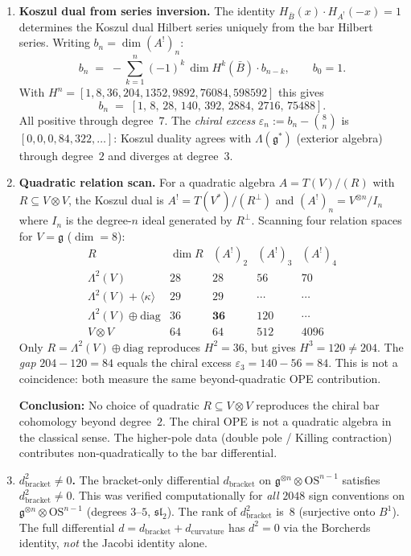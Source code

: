 \documentclass[11pt]{article}
\newcommand{\fg}{\mathfrak{g}}
\newcommand{\fsl}{\mathfrak{sl}}
\newcommand{\B}{\bar{B}}
\begin{document}
\begin{enumerate}[label=(\roman*)]
\item \textbf{Koszul dual from series inversion.}
The identity $H_{\B}(x)\cdot H_{A^!}(-x) = 1$ determines the
Koszul dual Hilbert series uniquely from the bar Hilbert series.
Writing $b_n = \dim (A^!)_n$:
\[
  b_n \;=\; -\sum_{k=1}^{n} (-1)^k\, \dim H^k(\B)\cdot b_{n-k},
  \qquad b_0 = 1.
\]
With $H^n = [1,8,36,204,1352,9892,76084,598592]$ this gives
\[
  b_n \;=\; [1,\,8,\,28,\,140,\,392,\,2884,\,2716,\,75488].
\]
All positive through degree~$7$.  The \emph{chiral excess}
$\varepsilon_n := b_n - \binom{8}{n}$ is $[0,0,0,84,322,\ldots]$:
Koszul duality agrees with $\Lambda(\fg^*)$ (exterior algebra) through
degree~$2$ and diverges at degree~$3$.

\item \textbf{Quadratic relation scan.}
For a quadratic algebra $A = T(V)/(R)$ with $R \subseteq V\otimes V$,
the Koszul dual is $A^! = T(V^*)/(R^\perp)$ and
$(A^!)_n = V^{\otimes n}/I_n$ where $I_n$ is the degree-$n$ ideal
generated by $R^\perp$.  Scanning four relation spaces for
$V = \fg$ ($\dim = 8$):
\[
\renewcommand{\arraystretch}{1.2}
\begin{array}{lcccc}
  R & \dim R & (A^!)_2 & (A^!)_3 & (A^!)_4 \\
  \hline
  \Lambda^2(V) & 28 & 28 & 56 & 70 \\
  \Lambda^2(V) + \langle\kappa\rangle & 29 & 29 & \cdots & \cdots \\
  \Lambda^2(V) \oplus \mathrm{diag} & 36 & \mathbf{36} & 120 & \cdots \\
  V\otimes V & 64 & 64 & 512 & 4096
\end{array}
\]
Only $R = \Lambda^2(V)\oplus\mathrm{diag}$ reproduces
$H^2 = 36$, but gives $H^3 = 120 \neq 204$.  The \emph{gap}
$204 - 120 = 84$ equals the chiral excess $\varepsilon_3 = 140 - 56 = 84$.
This is not a coincidence: both measure the same beyond-quadratic
OPE contribution.

\textbf{Conclusion:} No choice of quadratic $R\subseteq V\otimes V$
reproduces the chiral bar cohomology beyond degree~$2$.  The chiral
OPE is not a quadratic algebra in the classical sense.  The
higher-pole data (double pole / Killing contraction) contributes
non-quadratically to the bar differential.

\item \textbf{$d_{\mathrm{bracket}}^2 \neq 0$.}
The bracket-only differential $d_{\mathrm{bracket}}$ on
$\fg^{\otimes n}\otimes \mathrm{OS}^{n-1}$ satisfies
$d_{\mathrm{bracket}}^2 \neq 0$.  This was verified computationally
for \emph{all} $2048$ sign conventions on $\fg^{\otimes n}\otimes
\mathrm{OS}^{n-1}$ (degrees $3$--$5$, $\fsl_2$).  The rank of
$d_{\mathrm{bracket}}^2$ is~$8$ (surjective onto $B^1$).
The full differential $d = d_{\mathrm{bracket}} + d_{\mathrm{curvature}}$
has $d^2 = 0$ via the Borcherds identity, \emph{not} the Jacobi identity alone.


\end{enumerate}
\end{document}
